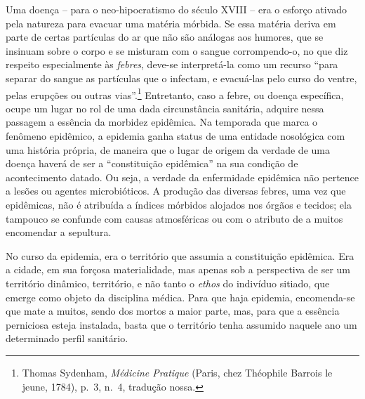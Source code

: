Uma doença -- para o neo-hipocratismo do século XVIII -- era o esforço
ativado pela natureza para evacuar uma matéria mórbida. Se essa matéria
deriva em parte de certas partículas do ar que não são análogas aos
humores, que se insinuam sobre o corpo e se misturam com o sangue
corrompendo-o, no que diz respeito especialmente às \emph{febres},
deve-se interpretá-la como um recurso ``para separar do sangue as
partículas que o infectam, e evacuá-las pelo curso do ventre, pelas
erupções ou outras vias''.\footnote{Thomas Sydenham, \emph{Médicine
  Pratique} (Paris, chez Théophile Barrois le jeune, 1784), p.~3, n.~4,
  tradução nossa.} Entretanto, caso a febre, ou doença específica, ocupe
um lugar no rol de uma dada circunstância sanitária, adquire nessa
passagem a essência da morbidez epidêmica. Na temporada que marca o
fenômeno epidêmico, a epidemia ganha status de uma entidade nosológica
com uma história própria, de maneira que o lugar de origem da verdade de
uma doença haverá de ser a ``constituição epidêmica'' na sua condição de
acontecimento datado. Ou seja, a verdade da enfermidade epidêmica não
pertence a lesões ou agentes microbióticos. A produção das diversas
febres, uma vez que epidêmicas, não é atribuída a índices mórbidos
alojados nos órgãos e tecidos; ela tampouco se confunde com causas
atmosféricas ou com o atributo de a muitos encomendar a sepultura.

No curso da epidemia, era o território que assumia a constituição
epidêmica. Era a cidade, em sua forçosa materialidade, mas apenas sob a
perspectiva de ser um território dinâmico, território, e não tanto o
\emph{ethos} do indivíduo sitiado, que emerge como objeto da disciplina
médica. Para que haja epidemia, encomenda-se que mate a muitos, sendo
dos mortos a maior parte, mas, para que a essência perniciosa esteja
instalada, basta que o território tenha assumido naquele ano um
determinado perfil sanitário.

